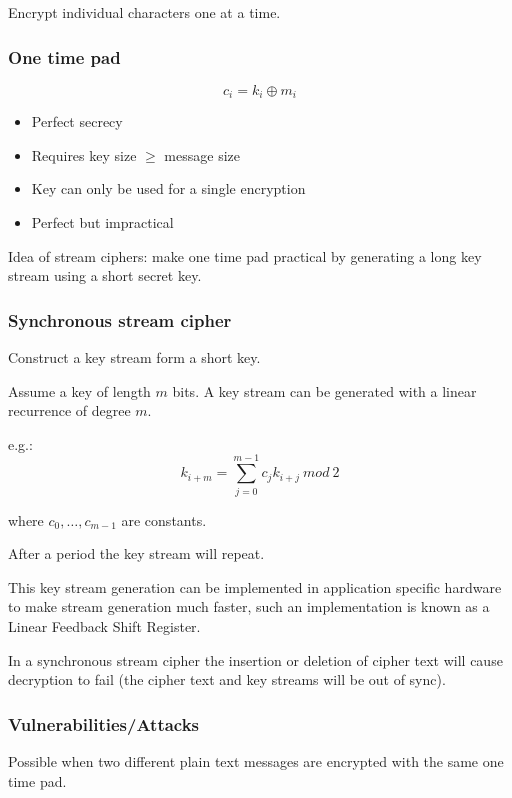 \documentclass[a4paper]{article}
\begin{document}
Encrypt individual characters one at a time.

\subsubsection{One time pad}
\label{sec:one_time_pad}

\[
  c_{i} = k_{i} \oplus m_{i}
\]

\begin{itemize}
  \item Perfect secrecy
  \item Requires key size $\geq$ message size
  \item Key can only be used for a single encryption
  \item Perfect but impractical
\end{itemize}

Idea of stream ciphers: make one time pad practical by generating a long key
stream using a short secret key.

\subsubsection{Synchronous stream cipher}

Construct a key stream form a short key.

Assume a key of length $m$ bits. A key stream can be generated with a linear
recurrence of degree $m$.

e.g.:
\[
  k_{i+m} = \sum^{m-1}_{j=0} c_{j}k_{i+j} \: mod \: 2
\]

where $c_{0}, \ldots, c_{m-1}$ are constants.

After a period the key stream will repeat.

This key stream generation can be implemented in application specific hardware
to make stream generation much faster, such an implementation is known as a
Linear Feedback Shift Register.

In a synchronous stream cipher the insertion or deletion of cipher text will
cause decryption to fail (the cipher text and key streams will be out of sync).

\subsubsection{Vulnerabilities/Attacks}


Possible when two different plain text messages are encrypted with the same one
time pad.
\end{document}
